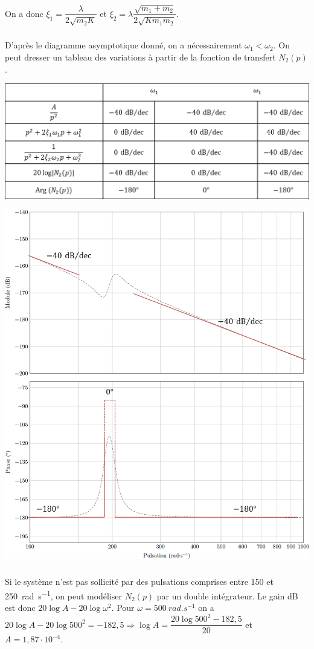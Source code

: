 \documentclass[10pt,fleqn]{article} %
\begin{document}
On a donc $\xi_1=\dfrac{\lambda}{2  \sqrt{m_2K}}$ et 
$\xi_2=\lambda\dfrac{\sqrt{m_1+ m_2}}{2\sqrt{Km_1m_2}}$.



\subparagraph{}
D'après le diagramme asymptotique donné, on a nécessairement $\omega_1<\omega_2$. On peut dresser un tableau des variations à partir de la fonction de transfert $N_2(p)$. 
\begin{center}
\includegraphics[width=.7\linewidth]{images/fig_06}

\includegraphics[width=.7\linewidth]{images/fig_07}
\end{center}

\subparagraph{}
Si le système n'est pas sollicité par des pulsations comprises entre 150 et \SI{250}{rad.s^{-1}}, on peut modéliser $N_2(p)$ par un double intégrateur. 
Le gain dB est donc  $20\log A - 20 \log \omega^2$.  Pour $\omega=\SI{500}{rad.s^{-1}}$ on a $20\log A - 20 \log 500^2=-182,5 \Rightarrow \log A = \dfrac{20 \log 500^2-182,5}{20}$ et $A=1,87\cdot 10^{-4}$.


\subparagraph{}
\end{document}

